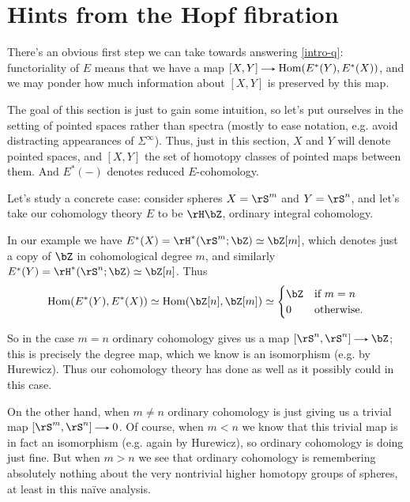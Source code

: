 
\section{Hints from the Hopf fibration}
\label{hopf}

There's an obvious first step we can take towards answering \cref{intro-q}: functoriality of $E$ means that we have a map $[X,Y] \to \Hom(E^*(Y),E^*(X))$, and we may ponder how much information about $[X,Y]$ is preserved by this map.

\begin{nothing}
  \label{hopf-just-spaces}
  The goal of this section is just to gain some intuition, so let's put ourselves in the setting of pointed spaces rather than spectra (mostly to ease notation, e.g. avoid distracting appearances of $\Sigma^\infty$). Thus, just in this section, $X$ and $Y$ will denote pointed spaces, and $[X,Y]$ the set of homotopy classes of pointed maps between them. And $E^*(-)$ denotes reduced $E$-cohomology.
\end{nothing}

\begin{nothing}
  \label{hopf-degree}
  Let's study a concrete case: consider spheres $X = \rS^m$ and $Y = \rS^n$, and let's take our cohomology theory $E$ to be $\rH\bZ$, ordinary integral cohomology.

  In our example we have $E^*(X) = \rH^*(\rS^m;\bZ) \iso \bZ[m]$, which denotes just a copy of $\bZ$ in cohomological degree $m$, and similarly $E^*(Y) = \rH^*(\rS^n;\bZ) \iso \bZ[n]$. Thus
  \[
    \Hom(E^*(Y),E^*(X)) \iso \Hom(\bZ[n],\bZ[m]) \iso
    \begin{cases}
      \bZ & \text{if}\ m=n\\
      0 & \text{otherwise}.
    \end{cases}
  \]

  So in the case $m=n$ ordinary cohomology gives us a map $[\rS^n,\rS^n] \to \bZ$; this is precisely the degree map, which we know is an isomorphism (e.g. by Hurewicz). Thus our cohomology theory has done as well as it possibly could in this case.

  On the other hand, when $m \ne n$ ordinary cohomology is just giving us a trivial map $[\rS^m,\rS^n] \to 0$. Of course, when $m < n$ we know that this trivial map is in fact an isomorphism (e.g. again by Hurewicz), so ordinary cohomology is doing just fine. But when $m > n$ we see that ordinary cohomology is remembering absolutely nothing about the very nontrivial higher homotopy groups of spheres, at least in this na\"ive analysis.
\end{nothing}

